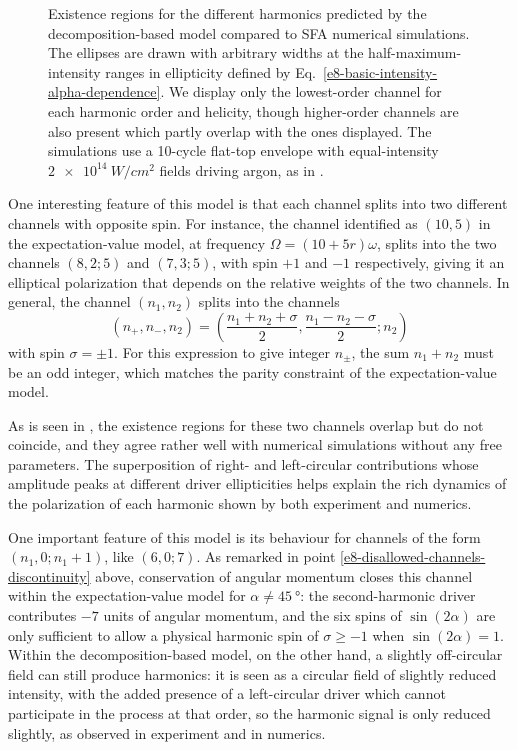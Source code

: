 \begin{figure}[h]
  \captionsetup{width=\textwidth}
  \caption[
  Existence regions for bicircular harmonics using the decomposition-based model, compared to SFA simulations
  ]{
  Existence regions for the different harmonics predicted by the decomposition-based model compared to SFA numerical simulations. The ellipses are drawn with arbitrary widths at the half-maximum-intensity ranges in ellipticity defined by Eq.~\eqref{e8-basic-intensity-alpha-dependence}. We display only the lowest-order channel for each harmonic order and helicity, though higher-order channels are also present which partly overlap with the ones displayed. 
  The simulations use a 10-cycle flat-top envelope with equal-intensity $\SI{2e14}{W/cm^2}$ fields driving argon, as in .
  }
  \label{f8-existence-region-ellipses}
\end{figure}




One interesting feature of this model is that each channel splits into two different channels with opposite spin. For instance, the channel identified as $(10, 5)$ in the expectation-value model, at frequency $\Omega=(10+5r)\omega$, splits into the two channels $(8, 2; 5)$ and $(7, 3; 5)$, with spin $+1$ and $-1$ respectively, giving it an elliptical polarization that depends on the relative weights of the two channels. In general, the channel $(n_1,n_2)$ splits into the \mbox{channels}
\begin{equation}
 (n_+,n_-,n_2)=\left(\frac{n_1+n_2+\sigma}{2},\frac{n_1-n_2-\sigma}{2};n_2\right)
 \label{e8-channel-translation}
\end{equation}
with spin $\sigma=\pm1$. For this expression to give integer $n_\pm$, the sum $n_1+n_2$ must be an odd integer, which matches the parity constraint of the expectation-value model.

As is seen in , the existence regions for these two channels overlap but do not coincide, and they agree rather well with numerical simulations without any free parameters. The superposition of right- and left-circular contributions whose amplitude peaks at different driver ellipticities helps explain the rich dynamics of the polarization of each harmonic shown by both experiment and numerics. 





One important feature of this model is its behaviour for channels of the form $(n_1,0;n_1+1)$, like $(6,0;7)$. As remarked in point \ref{e8-disallowed-channels-discontinuity} above, conservation of angular momentum closes this channel within the expectation-value model for $\alpha\neq\SI{45}{\degree}$: the second-harmonic driver contributes $-7$ units of angular momentum, and the six spins of $\sin(2\alpha)$ are only sufficient to allow a physical harmonic spin of $\sigma \geq -1$ when $\sin(2\alpha)=1$. Within the decomposition-based model, on the other hand, a slightly off-circular field can still produce harmonics: it is seen as a circular field of slightly reduced intensity, with the added presence of a left-circular driver which cannot participate in the process at that order, so the harmonic signal is only reduced slightly, as observed in experiment and in numerics.

